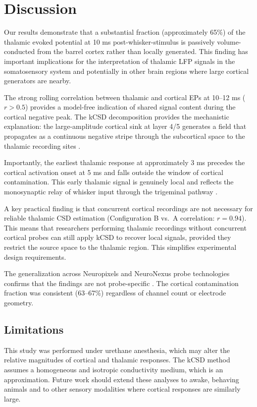 \documentclass[11pt]{article}
\begin{document}
\section{Discussion}

Our results demonstrate that a substantial fraction (approximately 65\%) of the thalamic evoked potential at 10 ms post-whisker-stimulus is passively volume-conducted from the barrel cortex rather than locally generated. This finding has important implications for the interpretation of thalamic LFP signals in the somatosensory system and potentially in other brain regions where large cortical generators are nearby.

The strong rolling correlation between thalamic and cortical EPs at 10--12 ms ($r > 0.5$) provides a model-free indication of shared signal content during the cortical negative peak. The kCSD decomposition provides the mechanistic explanation: the large-amplitude cortical sink at layer 4/5 generates a field that propagates as a continuous negative stripe through the subcortical space to the thalamic recording sites \citep{buzsaki2012, linden2011}.

Importantly, the earliest thalamic response at approximately 3 ms precedes the cortical activation onset at 5 ms and falls outside the window of cortical contamination. This early thalamic signal is genuinely local and reflects the monosynaptic relay of whisker input through the trigeminal pathway \citep{diamond2008, pierret1999}.

A key practical finding is that concurrent cortical recordings are not necessary for reliable thalamic CSD estimation (Configuration B vs.\ A correlation: $r = 0.94$). This means that researchers performing thalamic recordings without concurrent cortical probes can still apply kCSD to recover local signals, provided they restrict the source space to the thalamic region. This simplifies experimental design requirements.

The generalization across Neuropixels and NeuroNexus probe technologies confirms that the findings are not probe-specific \citep{jun2017, steinmetz2021}. The cortical contamination fraction was consistent (63--67\%) regardless of channel count or electrode geometry.

\subsection{Limitations}

This study was performed under urethane anesthesia, which may alter the relative magnitudes of cortical and thalamic responses. The kCSD method assumes a homogeneous and isotropic conductivity medium, which is an approximation. Future work should extend these analyses to awake, behaving animals and to other sensory modalities where cortical responses are similarly large.
\end{document}
